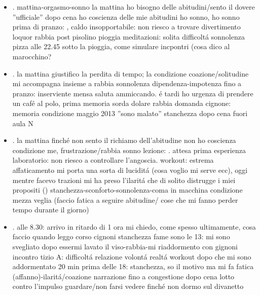 \begin{itemize}
\item {}.
mattina-orgasmo-sonno
la mattina ho bisogno delle abitudini/sento il dovere ''ufficiale''
dopo cena ho coscienza delle mie abitudini
ho sonno, ho sonno prima di pranzo: , 
caldo insopportabile: non riesco a trovare divertimento loquor
rabbia post pisolino pioggia meditazioni:
solita difficolt\'a sonnolenza pizza alle 22.45 sotto la pioggia, come simulare incpontri (cosa dico al marocchino?
\item {}.
la mattina giustifico la perdita di tempo; la condizione coazione/solitudine mi accompagna insieme a rabbia sonnolenza dipendenza-impotenza fino a pranzo: inserviente mensa saluta ammiccando.
\'e tardi ho urgenza di prendere un caf\'e al polo, prima 
memoria sorda dolare rabbia
domanda cignone: memoria condizione maggio 2013 ''sono malato''
stanchezza dopo cena fuori aula N
\item {}.
la mattina finch\'e non sento il richiamo dell'abitudine non ho coscienza condizione me, frustrazione/rabbia sonno lezione: .
attesa prima esperienza laboratorio: non riesco a controllare l'angoscia.
workout: estrema affaticamento mi porta una sorta di lucidit\'a (cosa voglio mi serve ecc), oggi mentre facevo trazioni mi ha preso l'ilarit\'a che di solito distrugge i miei propositi ()
stanchezza-sconforto-sonnolenza-coma
in macchina condizione mezza veglia (faccio fatica a seguire abitudine/ cose che mi fanno perder tempo durante il giorno)
\item {}.
alle 8.30: arrivo in ritardo di 1 ora
mi chiedo, come spesso ultimamente, cosa faccio quando leggo
corso cignoni stanchezza fame sono le 13: mi sono svegliato dopo essermi lavato il viso-rabbia-mi riaddormento con gignoni
incontro tizio A: difficolt\'a relazione volont\'a realt\'a
workout dopo che mi sono addormentato 20 min prima delle 18: stanchezza, so il motivo ma mi fa fatica (affanno)-ilarit\'a/coazione narrazione fino a congestione
dopo cena lotto contro l'impulso guardare/non farsi vedere finch\'e non dormo sul divanetto

\end{itemize}
